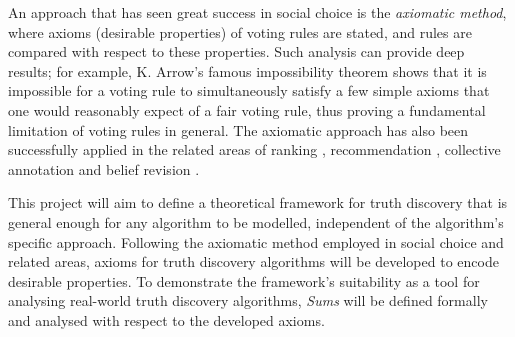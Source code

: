 \documentclass[../main.tex]{subfiles}
\begin{document}
An approach that has seen great success in social choice is the \emph{axiomatic
method}, where axioms (desirable properties) of voting rules are stated, and
rules are compared with respect to these properties. Such analysis can provide
deep results; for example, K. Arrow's famous impossibility theorem \cite{arrow}
shows that it is impossible for a voting rule to simultaneously satisfy a few
simple axioms that one would reasonably expect of a fair voting rule, thus
proving a fundamental limitation of voting rules in general. The axiomatic
approach has also been successfully applied in the related areas of ranking
\cite{altman_foundations, altman_personalised}, recommendation \cite{andersen,
lev}, collective annotation \cite{kruger} and belief revision \cite{agm}.

This project will aim to define a theoretical framework for truth discovery
that is general enough for any algorithm to be modelled, independent of the
algorithm's specific approach. Following the axiomatic method employed in
social choice and related areas, axioms for truth discovery algorithms will be
developed to encode desirable properties. To demonstrate the framework's
suitability as a tool for analysing real-world truth discovery algorithms,
\emph{Sums} \cite{pasternack} will be defined formally and analysed with
respect to the developed axioms.
\end{document}
